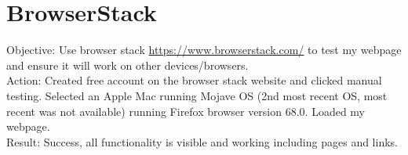 \documentclass{article}
\begin{document}
\section{BrowserStack}

Objective: Use browser stack \href{https://www.browserstack.com/}{https://www.browserstack.com/} to test my webpage and ensure it will work on other devices/browsers. \\
Action: Created free account on the browser stack website and clicked manual testing. Selected an Apple Mac running Mojave OS (2nd most recent OS, most recent was not available) running Firefox browser version 68.0. Loaded my webpage.\\
Result: Success, all functionality is visible and working including pages and links.  
\end{document}
